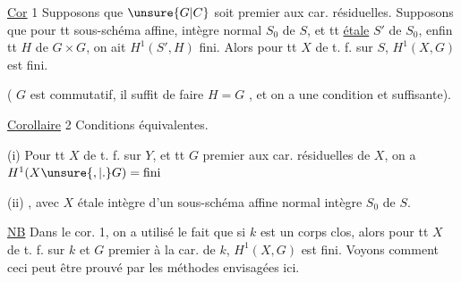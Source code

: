 
\uline{Cor} 1 Supposons que $\unsure{G|C}$ soit premier aux car. résiduelles.  Supposons que pour tt sous-schéma affine, intègre normal $S_0$ de $S$, et tt \uline{} \uline{étale}  $S'$ de $S_0$, enfin tt  $H$ de $G\times G$, on ait $H^1(S',H)$ fini. Alors pour tt $X$ de t. f. sur $S$, $H^1(X,G)$ est fini.

( $G$ est commutatif, il suffit de faire $H=G$ , et on a une condition  et suffisante).

\uline{Corollaire} 2 Conditions équivalentes.

(i) Pour tt $X$ de t. f. sur $Y$, et tt   $G$ premier aux car. résiduelles de $X$, on a $H^1(X\unsure{,|.}G)=\text{fini}$

(ii)  , avec $X$   étale intègre d'un sous-schéma affine normal intègre $S_0$ de $S$.

\uline{NB} Dans le cor. 1, on a utilisé le fait que si $k$ est un corps  clos, alors pour tt $X$ de t. f. sur $k$ et $G$ premier à la car. de $k$, $H^1(X,G)$ est fini. Voyons comment ceci peut être prouvé par les méthodes envisagées ici.
